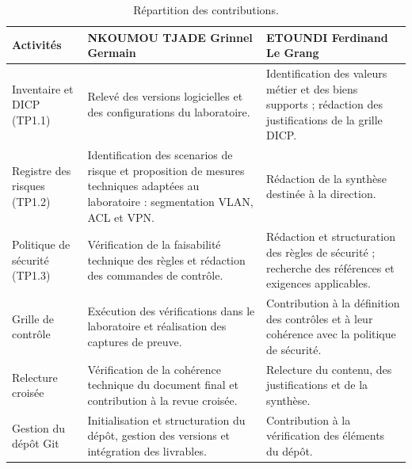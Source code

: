 \documentclass[11pt,a4paper]{article}
\begin{document}
	\small
	\begin{longtable}{p{3.1cm} p{5.6cm} p{5.6cm}}
		\caption{Répartition des contributions.}\\
		\hline
		\textbf{Activités} & \textbf{NKOUMOU TJADE Grinnel Germain} & \textbf{ETOUNDI Ferdinand Le Grang} \\
		\hline
		\endhead
		
		Inventaire et DICP (TP1.1)
		& Relevé des versions logicielles et des configurations du laboratoire.
		& Identification des valeurs métier et des biens supports ; rédaction des justifications de la grille DICP. \\
		\hline
		
		Registre des risques (TP1.2)
		& Identification des scenarios de risque et proposition de mesures techniques adaptées au laboratoire : segmentation VLAN, ACL et VPN.
		& Rédaction de la synthèse destinée à la direction. \\
		\hline
		
		Politique de sécurité (TP1.3)
		& Vérification de la faisabilité technique des règles et rédaction des commandes de contrôle.
		& Rédaction et structuration des règles de sécurité ; recherche des références et exigences applicables. \\
		\hline
		
		Grille de contrôle
		& Exécution des vérifications dans le laboratoire et réalisation des captures de preuve.
		& Contribution à la définition des contrôles et à leur cohérence avec la politique de sécurité. \\
		\hline
		
		Relecture croisée
		& Vérification de la cohérence technique du document final et contribution à la revue croisée.
		& Relecture du contenu, des justifications et de la synthèse. \\
		\hline
		
		Gestion du dépôt Git
		& Initialisation et structuration du dépôt, gestion des versions et intégration des livrables.
		& Contribution à la vérification des éléments du dépôt. \\
		
	\hline
	\end{longtable}
	\normalsize
	
\end{document}

